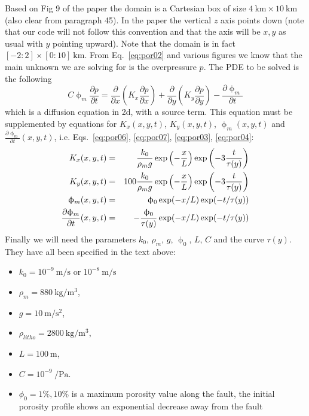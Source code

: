 Based on Fig 9 of the paper the domain is a Cartesian box of 
size $4~\si{\km} \times 10~\si{\km}$ (also clear from paragraph 45). 
In the paper the vertical $z$ axis points down (note that our code will 
not follow this convention and that the axis will be $x,y$ as usual with $y$
pointing upward). 
Note that the domain is in fact $[-2:2]\times[0:10]~\si{\km}$. 
From Eq.~\eqref{eq:por02} and various figures we know that the main 
unknown we are solving for is the overpressure $p$.
The PDE to be solved is the following 
\[
C \upphi_m \frac{\partial p}{\partial t} 
=\frac{\partial}{\partial x} \left( K_x \frac{\partial p}{\partial x} \right) 
+ \frac{\partial}{\partial y} \left( K_y \frac{\partial p}{\partial y} \right)
- \frac{\partial \upphi_m}{\partial t} 
\]
which is a diffusion equation in 2d, with a source term. 
This equation must be supplemented by equations for $K_x(x,y,t)$, $K_y(x,y,t)$, $\upphi_m(x,y,t)$ and 
$\frac{\partial \upphi_m}{\partial t} (x,y,t)$, i.e. Eqs.~\eqref{eq:por06}, 
\eqref{eq:por07}, \eqref{eq:por03}, \eqref{eq:por04}:
\begin{eqnarray}
K_x(x,y,t) &=& \frac{k_0 }{\rho_m g}  \exp\left(-\frac{x}{L}\right) \exp\left(-3\frac{t}{\tau(y)}\right) \nonumber\\
K_y(x,y,t) &=& 100\frac{k_0 }{\rho_m g}  \exp\left(-\frac{x}{L}\right) \exp\left(-3\frac{t}{\tau(y)}\right) \nonumber\\
\upphi_m(x,y,t) &=& \upphi_0 \exp (-x/L) \exp (-t/\tau(y)) \nonumber\\
\frac{\partial \upphi_m}{\partial t}(x,y,t) &=& -\frac{\upphi_0}{\tau(y)} \exp (-x/L) \exp (-t/\tau(y)) \nonumber
\end{eqnarray}
Finally we will need the parameters $k_0$, $\rho_m$, $g$, $\upphi_0$, $L$, $C$ and the curve $\tau(y)$.
They have all been specified in the text above:

\begin{itemize}
\item $k_0 = 10^{-9}~\si{\meter\per\second}$ or $10^{-8}~\si{\meter\per\second}$
\item $\rho_m=880~\si{\kg\per\cubic\meter}$, 
\item $g=10~\si{\meter\per\square\second}$, 
\item $\rho_{litho}=2800~\si{\kg\per\cubic\meter}$, 
\item $L=100~\si{\meter}$, 
\item $C=10^{-9}~\si{\per\pascal}$.
\item $\phi_0=1\%,10\%$ is a maximum porosity value along the fault, the initial porosity profile shows an
exponential decrease away from the fault
\end{itemize}

